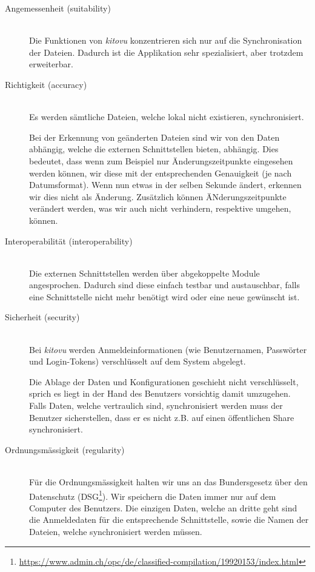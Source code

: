 \documentclass[a4paper]{article}
\begin{document}
\begin{description}
  \item[Angemessenheit (suitability)] \strut \\
    Die Funktionen von \emph{kitovu} konzentrieren sich nur auf die Synchronisation der Dateien.
    Dadurch ist die Applikation sehr spezialisiert, aber trotzdem erweiterbar.
  \item[Richtigkeit (accuracy)] \strut \\
    Es werden sämtliche Dateien, welche lokal nicht existieren, synchronisiert.

    Bei der Erkennung von geänderten Dateien sind wir von den Daten abhängig, welche die externen Schnittstellen bieten, abhängig.
    Dies bedeutet, dass wenn zum Beispiel nur Änderungszeitpunkte eingesehen werden können, wir diese mit der entsprechenden Genauigkeit (je nach Datumsformat).
    Wenn nun etwas in der selben Sekunde ändert, erkennen wir dies nicht als Änderung.
    Zusätzlich können ÄNderungszeitpunkte verändert werden, was wir auch nicht verhindern, respektive umgehen, können.
  \item[Interoperabilität (interoperability)] \strut \\
    Die externen Schnittstellen werden über abgekoppelte Module angesprochen.
    Dadurch sind diese einfach testbar und austauschbar, falls eine Schnittstelle nicht mehr benötigt wird oder eine neue gewünscht ist.
  \item[Sicherheit (security)] \strut \\
    Bei \emph{kitovu} werden Anmeldeinformationen (wie Benutzernamen, Passwörter und Login-Tokens) verschlüsselt auf dem System abgelegt.

    Die Ablage der Daten und Konfigurationen geschieht nicht verschlüsselt, sprich es liegt in der Hand des Benutzers vorsichtig damit umzugehen.
    Falls Daten, welche vertraulich sind, synchronisiert werden muss der Benutzer sicherstellen, dass er es nicht z.B. auf einen öffentlichen Share synchronisiert.
  \item[Ordnungsmässigkeit (regularity)] \strut \\
    Für die Ordnungsmässigkeit halten wir uns an das Bundersgesetz über den Datenschutz (DSG\footnote{\url{https://www.admin.ch/opc/de/classified-compilation/19920153/index.html}}).
    Wir speichern die Daten immer nur auf dem Computer des Benutzers.
    Die einzigen Daten, welche an dritte geht sind die Anmeldedaten für die entsprechende Schnittstelle, sowie die Namen der Dateien, welche synchronisiert werden müssen.


\end{description}
\end{document}
